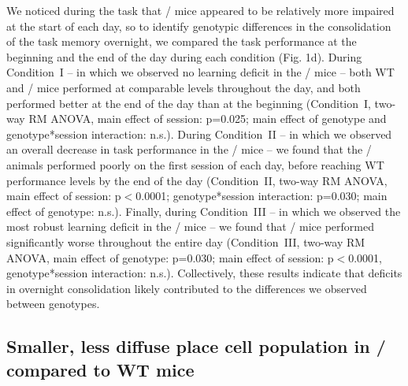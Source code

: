 We noticed during the task that \df/ mice appeared to be relatively more impaired at the start of each day, so to identify genotypic differences in the consolidation of the task memory overnight, we compared the task performance at the beginning and the end of the day during each condition (Fig. 1d). During Condition~I – in which we observed no learning deficit in the \df/ mice – both WT and \df/ mice performed at comparable levels throughout the day, and both performed better at the end of the day than at the beginning (Condition~I, two-way RM ANOVA, main effect of session: p=0.025; main effect of genotype and genotype*session interaction: n.s.). During Condition~II – in which we observed an overall decrease in task performance in the \df/ mice –  we found that the \df/ animals performed poorly on the first session of each day, before reaching WT performance levels by the end of the day (Condition~II, two-way RM ANOVA, main effect of session: p$<$0.0001; genotype*session interaction: p=0.030; main effect of genotype: n.s.). Finally, during Condition~III – in which we observed the most robust learning deficit in the \df/ mice – we found that \df/ mice performed significantly worse throughout the entire day (Condition~III, two-way RM ANOVA, main effect of genotype: p=0.030; main effect of session: p$<$0.0001, genotype*session interaction: n.s.). Collectively, these results indicate that deficits in overnight consolidation likely contributed to the differences we observed between genotypes.

\subsection{Smaller, less diffuse place cell population in \df/ compared to WT mice}

